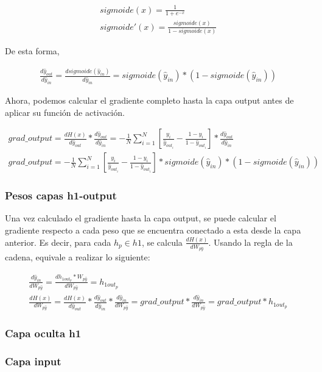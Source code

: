\begin{gather}
	sigmoide(x) = \frac{1}{1+e^{-x}} \\
	sigmoide'(x) = \frac{sigmoide(x)}{1-sigmoide(x)}
\end{gather}

De esta forma,

\begin{gather}
	\frac{d\hat{y}_{out}}{d\hat{y}_{in}} = \frac{d sigmoide(\hat{y}_{in})}{d\hat{y}_{in}} = sigmoide(\hat{y}_{in})*(1-sigmoide(\hat{y}_{in}))
\end{gather}

Ahora, podemos calcular el gradiente completo hasta la capa output antes de aplicar su función de activación.

\begin{gather}
	grad\_output = \frac{dH(x)}{d\hat{y}_{out}} * \frac{d\hat{y}_{out}}{d\hat{y}_{in}} =
	- \frac{1}{N} \sum_{i=1}^{N}  [ \frac{y_i}{\hat{y}_{out_i}} - \frac{1-y_i}{1-\hat{y}_{out_i}} ] * \frac{d\hat{y}_{out}}{d\hat{y}_{in}} \\
	grad\_output = - \frac{1}{N} \sum_{i=1}^{N}  [ \frac{y_i}{\hat{y}_{out_i}} - \frac{1-y_i}{1-\hat{y}_{out_i}} ] * sigmoide(\hat{y}_{in})*(1-sigmoide(\hat{y}_{in}))
\end{gather}

\subsubsection{Pesos capas h1-output}

Una vez calculado el gradiente hasta la capa output, se puede calcular el gradiente respecto a cada peso que se encuentra conectado a esta desde la capa anterior. Es decir, para cada $h_p\in h1$, se calcula $\frac{dH(x)}{dW_{p\hat{y}}}$. Usando la regla de la cadena, equivale a realizar lo siguiente:

\begin{gather}
	\frac{d\hat{y}_{in}}{dW_{p\hat{y}}} = \frac{dh_{1out_p} * W_{p\hat{y}}}{dW_{p\hat{y}}} = h_{1out_p} \\
	\frac{dH(x)}{dW_{p\hat{y}}} = \frac{dH(x)}{d\hat{y}_{out}} * \frac{d\hat{y}_{out}}{d\hat{y}_{in}} * \frac{d\hat{y}_{in}}{dW_{p\hat{y}}} =  grad\_output * \frac{d\hat{y}_{in}}{dW_{p\hat{y}}} = grad\_output * h_{1out_p}
\end{gather}

\subsubsection{Capa oculta h1}

\subsubsection{Capa input}